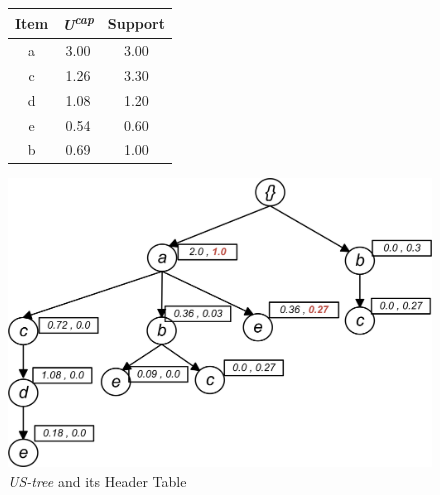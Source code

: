%

\begin{figure}
\begin{minipage}{0.40\textwidth}
  \centering
  
	\begin{center}
	\begin{tabular}{ |c|c|c| } 
 	\hline
 		Item&\emph{U\textsuperscript{cap}}&Support\\ \hline\hline
 		a &  3.00  & 3.00	\\ \hline
 		c &  1.26  & 3.30	\\ \hline
 		d &  1.08  & 1.20	\\ \hline
 		e &  0.54  & 0.60	\\ \hline
 		b &  0.69  & 1.00	\\ \hline
\end{tabular}
\end{center}   
\end{minipage}
\hfill
\begin{minipage}{0.40\textwidth}
  \centering
  \includegraphics[width=\textwidth]{../images/sim_06.jpg}
\end{minipage}
\caption{\emph{US-tree} and its Header Table}
\label{figure:min_before}
\end{figure}
